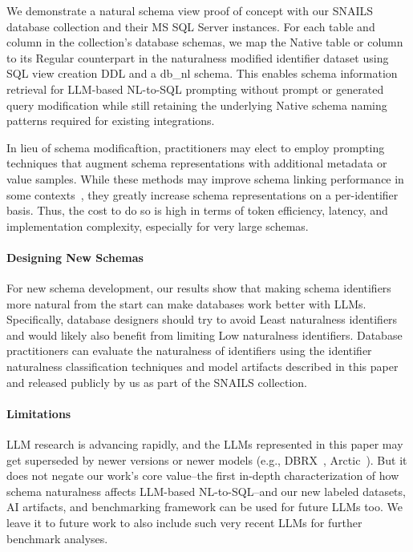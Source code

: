 We demonstrate a natural schema view proof of concept with our SNAILS database collection and their MS SQL Server instances.
For each table and column in the collection's database schemas, we map the Native table or column to its Regular counterpart in the naturalness modified identifier dataset using SQL view creation DDL and a db\_nl schema.
This enables schema information retrieval for LLM-based NL-to-SQL prompting without prompt or generated query modification while still retaining the underlying Native schema naming patterns required for existing integrations.

In lieu of schema modificaftion, practitioners may elect to employ prompting techniques that augment schema representations with additional metadata or value samples.
While these methods may improve schema linking performance in some contexts~\cite{nan2023enhancingfewshottexttosqlcapabilities}, they greatly increase schema representations on a per-identifier basis.
Thus, the cost to do so is high in terms of token efficiency, latency, and implementation complexity, especially for very large schemas.

\paragraph{\textbf{Designing New Schemas}}
For new schema development, our results show that making schema identifiers more natural from the start can make databases work better with LLMs.
Specifically, database designers should try to avoid Least naturalness identifiers and would likely also benefit from limiting Low naturalness identifiers.
Database practitioners can evaluate the naturalness of identifiers using the identifier naturalness classification techniques and model artifacts described in this paper and released publicly by us as part of the SNAILS collection.

\paragraph{\textbf{Limitations}}
LLM research is advancing rapidly, and the LLMs represented in this paper may get superseded by newer versions or newer models (e.g., DBRX~\cite{dbrx}, Arctic~\cite{snowflakearctic}).
But it does not negate our work's core value--the first in-depth characterization of how schema naturalness affects LLM-based NL-to-SQL--and our new labeled datasets, AI artifacts, and benchmarking framework can be used for future LLMs too.
We leave it to future work to also include such very recent LLMs for further benchmark analyses.

